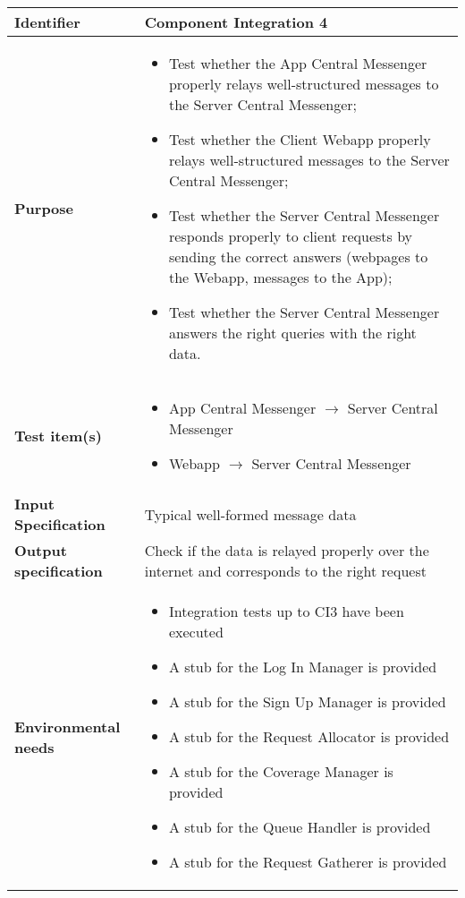 \begin{center}
\begin{tabular}{lp{}}
\toprule
\textbf{Identifier}		&	Component Integration 4\\
\midrule
\textbf{Purpose}		&	\begin{itemize}
					\item Test whether the App Central Messenger properly relays well-structured messages to the Server Central Messenger;
					\item Test whether the Client Webapp properly relays well-structured messages to the Server Central Messenger;
					\item Test whether the Server Central Messenger responds properly to client requests by sending the correct answers (webpages to the Webapp, messages to the App);
					\item Test whether the Server Central Messenger answers the right queries with the right data.
					\end{itemize}	\\
\textbf{Test item(s)}	&	\begin{itemize}
									\item App Central Messenger $\rightarrow$ Server Central Messenger
									\item Webapp $\rightarrow$ Server Central Messenger
									\end{itemize}\\

\textbf{Input Specification}	&	Typical well-formed message data\\
\textbf{Output specification}	&	Check if the data is relayed properly over the internet and corresponds to the right request\\
\textbf{Environmental needs}	&	\begin{itemize}
							\item Integration tests up to CI3 have been executed
							\item A stub for the Log In Manager is provided
							\item A stub for the Sign Up Manager is provided
							\item A stub for the Request Allocator is provided
							\item A stub for the Coverage Manager is provided
							\item A stub for the Queue Handler is provided
							\item A stub for the Request Gatherer is provided
							\end{itemize}	\\
\bottomrule
\end{tabular}
\end{center}

